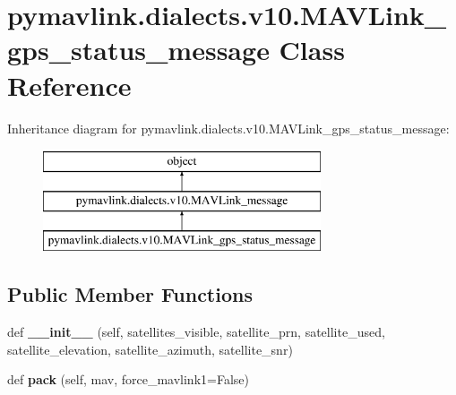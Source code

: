 \hypertarget{classpymavlink_1_1dialects_1_1v10_1_1MAVLink__gps__status__message}{}\section{pymavlink.\+dialects.\+v10.\+M\+A\+V\+Link\+\_\+gps\+\_\+status\+\_\+message Class Reference}
\label{classpymavlink_1_1dialects_1_1v10_1_1MAVLink__gps__status__message}
Inheritance diagram for pymavlink.\+dialects.\+v10.\+M\+A\+V\+Link\+\_\+gps\+\_\+status\+\_\+message\+:\begin{figure}[H]
\begin{center}
\leavevmode
\includegraphics[height=3.000000cm]{classpymavlink_1_1dialects_1_1v10_1_1MAVLink__gps__status__message}
\end{center}
\end{figure}
\subsection*{Public Member Functions}
\begin{DoxyCompactItemize}
\item 
\mbox{\label{classpymavlink_1_1dialects_1_1v10_1_1MAVLink__gps__status__message_a1c457d10d0b37191f173e87432bbb496}} 
def {\bfseries \+\_\+\+\_\+init\+\_\+\+\_\+} (self, satellites\+\_\+visible, satellite\+\_\+prn, satellite\+\_\+used, satellite\+\_\+elevation, satellite\+\_\+azimuth, satellite\+\_\+snr)
\item 
\mbox{\label{classpymavlink_1_1dialects_1_1v10_1_1MAVLink__gps__status__message_a4d14d617289483799310687797506cf6}} 
def {\bfseries pack} (self, mav, force\+\_\+mavlink1=False)
\end{DoxyCompactItemize}
